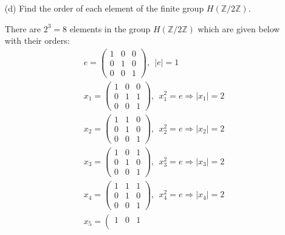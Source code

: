 \documentclass[12pt]{article}
\begin{document}
\begin{enumerate}
\begin{enumerate}
        \item[(d)] Find the order of each element of the
        finite group $H(\mathbb{Z}/2\mathbb{Z})$.
        \begin{mybox}
            
            There are $2^3=8$ elements in the group
            $H(\mathbb{Z}/2\mathbb{Z})$ which are given
            below with their orders:
            \begin{align*}
                &e=\left(\begin{array}{ccc}
                    1 & 0 & 0\\
                    0 & 1 & 0\\
                    0 & 0 & 1 \end{array}
                \right),\ \ |e|=1\\
                &x_1=\left(\begin{array}{ccc}
                    1 & 0 & 0\\
                    0 & 1 & 1\\
                    0 & 0 & 1 \end{array}
                \right),\ \ x_1^2=e\Longrightarrow |x_1|=2\\
                &x_2=\left(\begin{array}{ccc}
                    1 & 1 & 0\\
                    0 & 1 & 0\\
                    0 & 0 & 1 \end{array}
                \right),\ \ x_2^2=e\Longrightarrow |x_2|=2\\
                &x_3=\left(\begin{array}{ccc}
                    1 & 0 & 1\\
                    0 & 1 & 0\\
                    0 & 0 & 1 \end{array}
                \right),\ \ x_3^2=e\Longrightarrow |x_3|=2\\
                &x_4=\left(\begin{array}{ccc}
                    1 & 1 & 1\\
                    0 & 1 & 0\\
                    0 & 0 & 1 \end{array}
                \right),\ \ x_4^2=e\Longrightarrow |x_4|=2\\
                &x_5=\left(\begin{array}{ccc}
                    1 & 0 & 1\\

\end{array}
\end{align*}
\end{mybox}
\end{enumerate}
\end{enumerate}
\end{document}
